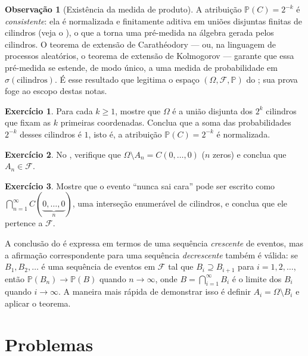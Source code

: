 \documentclass[12pt,portuguese]{article}
\let\geq\geqslant
\theoremstyle{definition}
\newtheorem{remark}[remark]{Observação}
\newtheorem{exercise}{Exercício}
\begin{document}
\begin{remark}[Existência da medida de produto]\label{obs:extensao}
A atribuição \(\mathbb{P}(C) = 2^{-k}\) é \emph{consistente}: ela é
normalizada e finitamente aditiva em uniões disjuntas finitas de cilindros
(veja o ), o que a torna uma pré-medida na álgebra
gerada pelos cilindros. O teorema de extensão de Carathéodory --- ou, na
linguagem de processos aleatórios, o teorema de extensão de Kolmogorov
\cite{TEK2025MatUnb, MR2893652} --- garante que essa pré-medida se estende, de
modo único, a uma medida de
probabilidade em \(\sigma(\text{cilindros})\). É esse resultado que legitima o
espaço \((\Omega,\mathcal{F},\mathbb{P})\) do ; sua prova foge ao
escopo destas notas.
\end{remark}

\begin{exercise}\label{ex:cilindros-particao}
Para cada \(k \geq 1\), mostre que \(\Omega\) é a união disjunta dos \(2^k\)
cilindros que fixam as \(k\) primeiras coordenadas. Conclua que a soma das
probabilidades \(2^{-k}\) desses cilindros é \(1\), isto é, a atribuição
\(\mathbb{P}(C) = 2^{-k}\) é normalizada.
\end{exercise}

\begin{exercise}
No , verifique que \(\Omega \setminus A_n = C(0,\ldots,0)\)
(\(n\) zeros) e conclua que \(A_n \in \mathcal{F}\).
\end{exercise}

\begin{exercise}
Mostre que o evento ``nunca sai cara'' pode ser escrito como
\(\bigcap_{n=1}^{\infty} C(\underbrace{0,\ldots,0}_{n})\), uma interseção
enumerável de cilindros, e conclua que ele pertence a \(\mathcal{F}\).
\end{exercise}

A conclusão do  é expressa em termos de uma sequência
\emph{crescente} de eventos, mas a afirmação correspondente para uma sequência
\emph{decrescente} também é válida: se \(B_1, B_2, \dots\) é uma sequência de
eventos em \(\mathcal{F}\) tal que \(B_i \supseteq B_{i+1}\) para \(i = 1, 2,
\dots\), então \(\mathbb{P}(B_n) \to \mathbb{P}(B)\) quando \(n \to \infty\),
onde \(B = \bigcap_{i=1}^\infty B_i\) é o limite dos \(B_i\) quando \(i \to
\infty\). A maneira mais rápida de demonstrar isso é definir \(A_i = \Omega
\setminus B_i\) e aplicar o teorema.

\section{Problemas}
\end{document}
